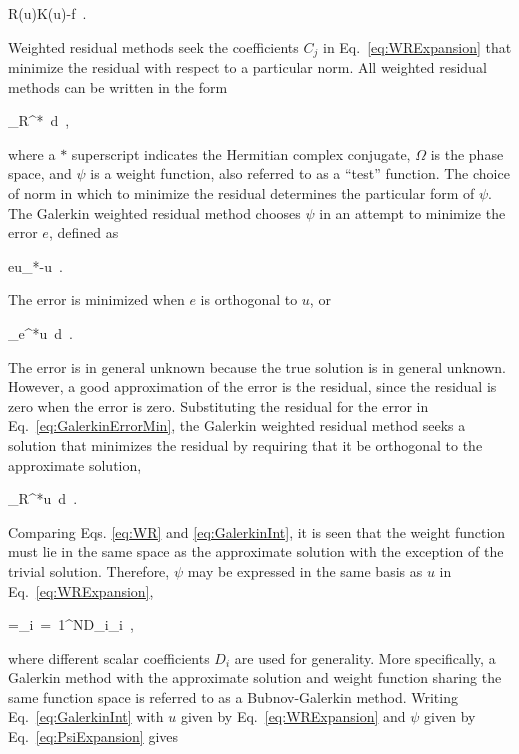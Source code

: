 \beq
\label{eq:residual}
R(u)\equiv K(u)-f\ .
\eeq

\noindent Weighted residual methods seek the coefficients \(C_j\) in Eq.\ \eqref{eq:WRExpansion} that minimize the residual with respect to a particular norm. All weighted residual methods can be written in the form

\beq
\label{eq:WR}
\int_\Omega R^*\psi\ d\ ,
\eeq

\noindent where a \(*\) superscript indicates the Hermitian complex conjugate, \(\Omega\) is the phase space, and \(\psi\) is a weight function, also referred to as a ``test'' function. The choice of norm in which to minimize the residual determines the particular form of \(\psi\). The Galerkin weighted residual method chooses \(\psi\) in an attempt to minimize the error \(e\), defined as

\beq
\label{eq:error123}
e\equiv u_*-u\ .
\eeq

\noindent The error is minimized when \(e\) is orthogonal to \(u\), or

\beq
\label{eq:GalerkinErrorMin}
\int_{\Omega}e^*u\ d\ .
\eeq

\noindent The error is in general unknown because the true solution is in general unknown. However, a good approximation of the error is the residual, since the residual is zero when the error is zero. Substituting the residual for the error in Eq.\ \eqref{eq:GalerkinErrorMin}, the Galerkin weighted residual method seeks a solution that minimizes the residual by requiring that it be orthogonal to the approximate solution,

\beq
\label{eq:GalerkinInt}
\int_{\Omega}R^*u\ d\ .
\eeq

\noindent Comparing Eqs. \eqref{eq:WR} and \eqref{eq:GalerkinInt}, it is seen that the weight function must lie in the same space as the approximate solution with the exception of the trivial solution. Therefore, \(\psi\) may be expressed in the same basis as \(u\) in Eq.\ \eqref{eq:WRExpansion},

\beq
\label{eq:PsiExpansion}
\psi=\sum_{i\ =\ 1}^ND_i\phi_i\ ,
\eeq

\noindent where different scalar coefficients \(D_i\) are used for generality. More specifically, a Galerkin method with the approximate solution and weight function sharing the same function space is referred to as a Bubnov-Galerkin method. Writing Eq.\ \eqref{eq:GalerkinInt} with \(u\) given by Eq.\ \eqref{eq:WRExpansion} and \(\psi\) given by Eq.\ \eqref{eq:PsiExpansion} gives

